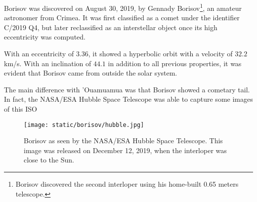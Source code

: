 Borisov was discovered on August 30, 2019, by Gennady Borisov\footnote{Borisov
discovered the second interloper using his home-built 0.65 meters
telescope.}, an amateur astronomer from Crimea. It was first classified as
a comet under the identifier C/2019 Q4, but later reclassified as an
interstellar object once its high eccentricity was computed.

With an eccentricity of $3.36$, it showed a hyperbolic orbit with a velocity of
$32.2$ km/s. With an inclination of $44.1$ in addition to all previous
properties, it was evident that Borisov came from outside the solar system.

The main difference with 'Ouamuamua was that Borisov showed a cometary tail. In
fact, the NASA/ESA Hubble Space Telescope was able to capture some images of
this ISO

\begin{figure}[H]
  \centering
  \texttt{[image: static/borisov/hubble.jpg]}
\caption[Borisov as seen by the NASA/ESA Hubble Space Telescope]{
Borisov as seen by the NASA/ESA Hubble Space Telescope. This image was
released on December 12, 2019, when the interloper was close to the Sun.
  }
  \label{fig:borisov_orbit}
\end{figure}







%
%
%
%
